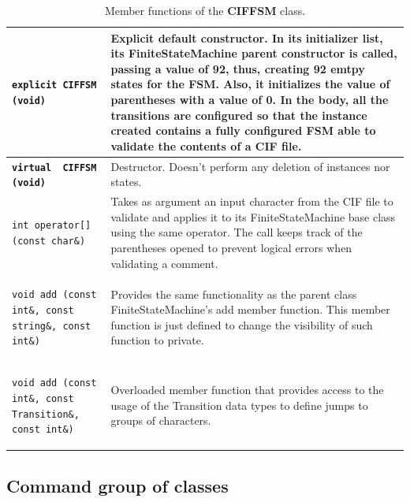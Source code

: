 \documentclass[11pt,twoside,openany,x11names,svgnames]{memoir}
\begin{document}
\begin{table}[h]\footnotesize
\centering
\begin{tabular}{| >{\bfseries}p{9.8cm} | p{5.7cm} |}
	\hline
	
	\texttt{explicit CIFFSM (void)} & Explicit default constructor. In its initializer list, its FiniteStateMachine parent constructor is called, passing a value of 92, thus, creating 92 emtpy states for the FSM. Also, it initializes the value of \textbf{parentheses} with a value of 0. In the body, all the transitions are configured so that the instance created contains a fully configured FSM able to validate the contents of a CIF file. \\
	
	\hline
	
	\texttt{virtual ~CIFFSM (void)} & Destructor. Doesn't perform any deletion of instances nor states. \\
	
	\hline
	
	\texttt{int operator[] (const char\&)} & Takes as argument an input character from the CIF file to validate and applies it to its FiniteStateMachine base class using the same operator. The call keeps track of the parentheses opened to prevent logical errors when validating a comment. \\
	
	\hline
	
	\texttt{void add (const int\&, const string\&, const int\&)} & Provides the same functionality as the parent class FiniteStateMachine's add member function. This member function is just defined to change the visibility of such function to private. \\
	
	\hline
	
	\texttt{void add (const int\&, const Transition\&, const int\&)} & Overloaded member function that provides access to the usage of the Transition data types to define jumps to groups of characters. \\
	
	\hline
\end{tabular}
\caption{Member functions of the \textbf{CIFFSM} class.}
\label{tab:CIFFSM-MemberFunctions}
\end{table}

\clearpage 

\subsection{Command group of classes}\label{Command-group-of-classes}
\end{document}
